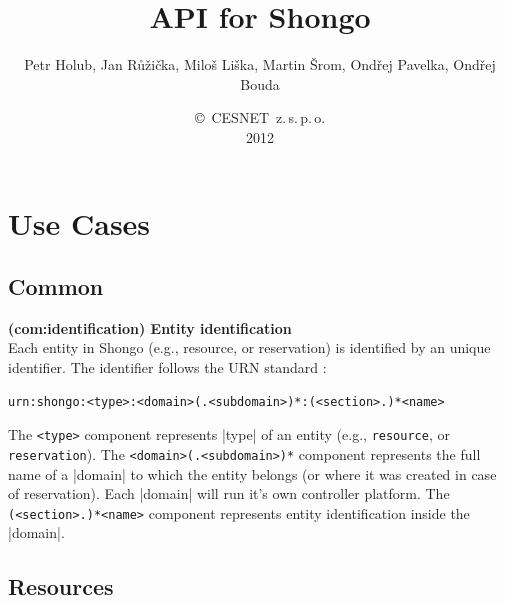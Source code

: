 \documentclass[a4paper]{report}
\makeatletter
\newcommand{\ApiValue}[1]{\verb|#1|}
\newcounter{UCcounter}
\newenvironment{UseCases}%
	{\begin{list}{\textbf{UC-\arabic{UCcounter}}}{\@nmbrlisttrue\def\@listctr{UCcounter}}}%
	{\end{list}}
\newcommand{\UClabel}[1]{\label{UC:#1}}
\newcommand{\UseCase}[2]{\item\UClabel{#2} \textbf{(#2) #1}\\ \nopagebreak}
\makeatother
\begin{document}
\title{API for Shongo}
\author{Petr Holub, Jan Růžička, Miloš Liška, Martin Šrom, Ondřej Pavelka, Ondřej Bouda}
\date{\copyright~CESNET~z.\,s.\,p.\,o.\\2012}

\maketitle

\tableofcontents

\chapter{Use Cases}

\section{Common}

\begin{UseCases}

\UseCase{Entity identification}{com:identification}
Each entity in Shongo (e.g., resource, or reservation) is identified by an unique identifier.
The identifier follows the URN standard \cite{rfc2141}:
\begin{verbatim}
urn:shongo:<type>:<domain>(.<subdomain>)*:(<section>.)*<name>
\end{verbatim}
The \ApiValue{<type>} component represents |type| of an entity (e.g., \ApiValue{resource}, or \ApiValue{reservation}). The \ApiValue{<domain>(.<subdomain>)*} component represents the full name of a |domain| to which the entity belongs (or where it was created in case of reservation). Each |domain| will run it's own controller platform. The \ApiValue{(<section>.)*<name>} component represents entity identification inside the |domain|.

\end{UseCases}


\section{Resources}
\end{document}
